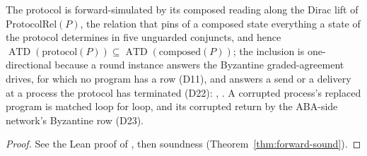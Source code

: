 \begin{theorem}
  \label{thm:aba-protocol-composed}
  \leanok
  The protocol is forward-simulated by its composed reading along the Dirac lift of $\mathrm{ProtocolRel}(P)$, the relation that pins of a composed state everything a state of the protocol determines in five unguarded conjuncts, and hence $\operatorname{ATD}(\mathrm{protocol}(P)) \subseteq \operatorname{ATD}(\mathrm{composed}(P))$; the inclusion is one-directional because a round instance answers the Byzantine graded-agreement drives, for which no program has a row (D11), and answers a send or a delivery at a process the protocol has terminated (D22): , .
  A corrupted process's replaced program is matched loop for loop, and its corrupted return by the ABA-side network's Byzantine row (D23).
\end{theorem}

\begin{proof}\leanok
  See the Lean proof of , then soundness (Theorem~\ref{thm:forward-sound}).
\end{proof}
